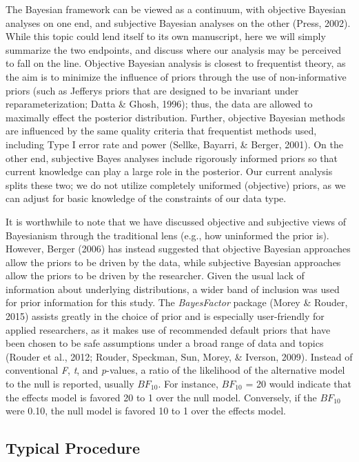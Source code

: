 \documentclass[,man, mask]{apa6}
\begin{document}
The Bayesian framework can be viewed as a continuum, with objective Bayesian analyses on one end, and subjective Bayesian analyses on the other (Press, 2002). While this topic could lend itself to its own manuscript, here we will simply summarize the two endpoints, and discuss where our analysis may be perceived to fall on the line. Objective Bayesian analysis is closest to frequentist theory, as the aim is to minimize the influence of priors through the use of non-informative priors (such as Jefferys priors that are designed to be invariant under reparameterization; Datta \& Ghosh, 1996); thus, the data are allowed to maximally effect the posterior distribution. Further, objective Bayesian methods are influenced by the same quality criteria that frequentist methods used, including Type I error rate and power (Sellke, Bayarri, \& Berger, 2001). On the other end, subjective Bayes analyses include rigorously informed priors so that current knowledge can play a large role in the posterior. Our current analysis splits these two; we do not utilize completely uniformed (objective) priors, as we can adjust for basic knowledge of the constraints of our data type.

It is worthwhile to note that we have discussed objective and subjective views of Bayesianism through the traditional lens (e.g., how uninformed the prior is). However, Berger (2006) has instead suggested that objective Bayesian approaches allow the priors to be driven by the data, while subjective Bayesian approaches allow the priors to be driven by the researcher. Given the usual lack of information about underlying distributions, a wider band of inclusion was used for prior information for this study. The \emph{BayesFactor} package (Morey \& Rouder, 2015) assists greatly in the choice of prior and is especially user-friendly for applied researchers, as it makes use of recommended default priors that have been chosen to be safe assumptions under a broad range of data and topics (Rouder et al., 2012; Rouder, Speckman, Sun, Morey, \& Iverson, 2009). Instead of conventional \emph{F}, \emph{t}, and \emph{p}-values, a ratio of the likelihood of the alternative model to the null is reported, usually \(BF_{10}\). For instance, \(BF_{10}\) = 20 would indicate that the effects model is favored 20 to 1 over the null model. Conversely, if the \(BF_{10}\) were 0.10, the null model is favored 10 to 1 over the effects model.

\hypertarget{typical-procedure-1}{%
\subsection{Typical Procedure}\label{typical-procedure-1}}
\end{document}
